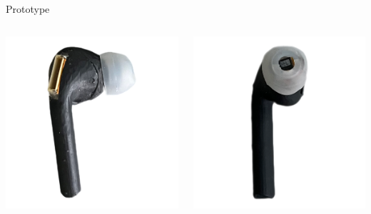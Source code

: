 \documentclass[en]{sdqbeamer}
\begin{document}
\begin{frame}{Prototype}
  \begin{columns}[T] %
    \begin{column}{.31\textwidth} %
      \includegraphics[width=0.9\linewidth]{../thesis-doc/images/prototype/Earpod_Side1.png} %
    \end{column}
    
    \begin{column}{.31\textwidth} %
      \includegraphics[width=0.9\linewidth]{../thesis-doc/images/prototype/Earpod_Front.png} %
    \end{column}


\end{columns}
\end{frame}
\end{document}
